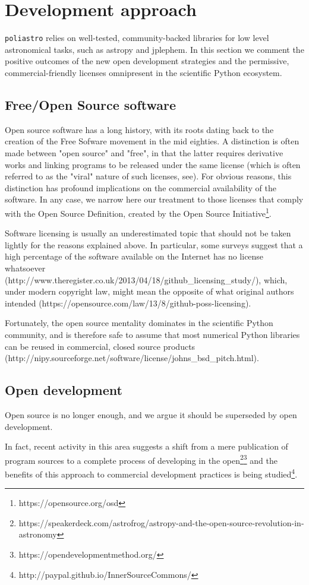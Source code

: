\section{Development approach}
\label{sec:development}

\verb|poliastro| relies on well-tested, community-backed libraries for low level astronomical tasks, such as astropy\cite{Robitaille2013} and jplephem. In this section we comment the positive outcomes of the new open development strategies and the permissive, commercial-friendly licenses omnipresent in the scientific Python ecosystem.

\subsection{Free/Open Source software}

Open source software has a long history, with its roots dating back to the creation of the Free Sofware movement in the mid eighties\cite{Stallman:1985:GM}. A distinction is often made between "open source" and "free", in that the latter requires derivative works and linking programs to be released under the same license (which is often referred to as the "viral" nature of such licenses, see\cite{stallman2009viewpoint}). For obvious reasons, this distinction has profound implications on the commercial availability of the software. In any case, we narrow here our treatment to those licenses that comply with the Open Source Definition, created by the Open Source Initiative\footnote{https://opensource.org/osd}.

Software licensing is usually an underestimated topic that should not be taken lightly for the reasons explained above. In particular, some surveys suggest that a high percentage of the software available on the Internet has no license whatsoever (http://www.theregister.co.uk/2013/04/18/github_licensing_study/), which, under modern copyright law, might mean the opposite of what original authors intended (https://opensource.com/law/13/8/github-poss-licensing).

Fortunately, the open source mentality dominates in the scientific Python community, and is therefore safe to assume that most numerical Python libraries can be reused in commercial, closed source products (http://nipy.sourceforge.net/software/license/johns_bsd_pitch.html).

\subsection{Open development}

Open source is no longer enough, and we argue it should be superseded by open development.

In fact, recent activity in this area suggests a shift from a mere publication of program sources to a complete process of developing in the open\footnote{https://speakerdeck.com/astrofrog/astropy-and-the-open-source-revolution-in-astronomy}\footnote{https://opendevelopmentmethod.org/} and the benefits of this approach to commercial development practices is being studied\footnote{http://paypal.github.io/InnerSourceCommons/}.
